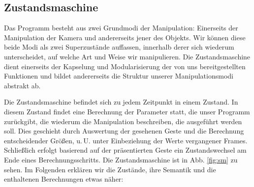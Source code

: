 \subsection{Zustandsmaschine}
	Das Programm besteht aus zwei Grundmodi der Manipulation: Einerseits der Manipulation der Kamera und andererseits jener des Objekts. Wir können diese beide Modi als zwei Superzustände auffassen, innerhalb derer sich wiederum unterscheidet, auf welche Art und Weise wir manipulieren. Die Zustandsmaschine dient einerseits der Kapselung und Modularisierung der von uns bereitgestellten Funktionen und bildet andererseits die Struktur unserer Manipulationsmodi abstrakt ab.\par 
	Die Zustandsmaschine befindet sich zu jedem Zeitpunkt in einem Zustand. In diesem Zustand findet eine Berechnung der Parameter statt, die unser Programm zurückgibt, die wiederum die Manipulation beschreiben, die ausgeführt werden soll. Dies geschieht durch Auswertung der gesehenen Geste und die Berechnung entscheidender Größen, u.\,U. unter Einbeziehung der Werte vergangener Frames. Schließlich erfolgt basierend auf der präsentierten Geste ein Zustandswechsel am Ende eines Berechnungsschritts. Die Zustandsmaschine ist in Abb. \ref{fig:sm} zu sehen. Im Folgenden erklären wir die Zustände, ihre Semantik und die enthaltenen Berechnungen etwas näher:
